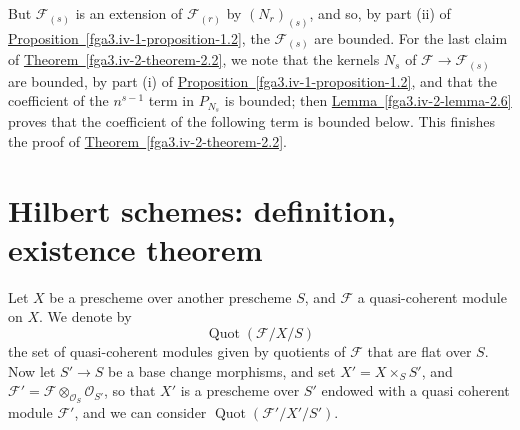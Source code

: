   But \(\mathscr {F}_{(s)}\) is an extension of \(\mathscr {F}_{(r)}\) by \((N_r)_{(s)}\), and so, by part (ii) of \hyperref[fga3.iv-1-proposition-1.2]{Proposition~\ref*{fga3.iv-1-proposition-1.2}}, the \(\mathscr {F}_{(s)}\) are bounded.
  For the last claim of \hyperref[fga3.iv-2-theorem-2.2]{Theorem~\ref*{fga3.iv-2-theorem-2.2}}, we note that the kernels \(N_s\) of \(\mathscr {F}\to \mathscr {F}_{(s)}\) are bounded, by part (i) of \hyperref[fga3.iv-1-proposition-1.2]{Proposition~\ref*{fga3.iv-1-proposition-1.2}}, and that the coefficient of the \(n^{s-1}\) term in \(P_{N_s}\) is bounded;
  then \hyperref[fga3.iv-2-lemma-2.6]{Lemma~\ref*{fga3.iv-2-lemma-2.6}} proves that the coefficient of the following term is bounded below.
  This finishes the proof of \hyperref[fga3.iv-2-theorem-2.2]{Theorem~\ref*{fga3.iv-2-theorem-2.2}}.\chapter{Hilbert schemes: definition, existence theorem}\thispagestyle{fancy}\label{fga3.iv-3}\par{}Let \(X\) be a prescheme over another prescheme \(S\), and \(\mathscr {F}\) a quasi-coherent module on \(X\).
  We denote by
  \[     \operatorname {Quot}({\mathscr {F}/X/S})   \]
  the set of quasi-coherent modules given by quotients of \(\mathscr {F}\) that are flat over \(S\).
  Now let \(S'\to  S\) be a base change morphisms, and set \(X'=X\times _S S'\), and \(\mathscr {F}'=\mathscr {F}\otimes _{\mathcal {O}_S}\mathcal {O}_{S'}\), so that \(X'\) is a prescheme over \(S'\) endowed with a quasi coherent module \(\mathscr {F}'\), and we can consider \(\operatorname {Quot}({\mathscr {F}'/X'/S'})\).
  
